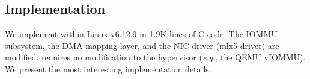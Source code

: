 \subsection{Implementation}
\label{vfree:sec:impl}

We implement \vfreebrand within Linux v6.12.9 in 1.9K lines of C code. 
The IOMMU subsystem, the DMA mapping layer, and the NIC driver (mlx5 driver)
    are modified.
\vfreebrand requires no modification to the hypervisor 
    (\textit{e.g.}, the QEMU vIOMMU).
We present the most interesting implementation details. 


\subsubsection{\optOneHeading}




